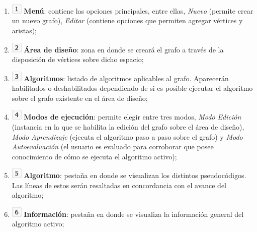 \documentclass{book}
\begin{document}
\begin{enumerate}
	\itemsep=8pt \topsep=0pt \partopsep=0pt \parskip=0pt \parsep=0pt
	
	\item [] \includegraphics[width=0.5cm]{images/number-1.png} \textbf{Menú}: contiene las opciones principales, entre ellas, \textit{Nuevo} (permite crear un nuevo grafo), \textit{Editar} (contiene opciones que permiten agregar vértices y aristas);

	\item [] \includegraphics[width=0.5cm]{images/number-2.png} \textbf{Área de diseño}: zona en donde se creará el grafo a través de la disposición de vértices sobre dicho espacio;

	\item [] \includegraphics[width=0.5cm]{images/number-3.png} \textbf{Algoritmos}: listado de algoritmos aplicables al grafo. Aparecerán habilitados o deshabilitados dependiendo de si es posible ejecutar el algoritmo sobre el grafo existente en el área de diseño;

	\item [] \includegraphics[width=0.5cm]{images/number-4.png} \textbf{Modos de ejecución}: permite elegir entre tres modos, \textit{Modo Edición} (instancia en la que se habilita la edición del grafo sobre el área de diseño), \textit{Modo Aprendizaje} (ejecuta el algoritmo paso a paso sobre el grafo) y \textit{Modo Autoevaluación} (el usuario es evaluado para corroborar que posee conocimiento de cómo se ejecuta el algoritmo activo);

	\item [] \includegraphics[width=0.5cm]{images/number-5.png} \textbf{Algoritmo}: pestaña en donde se visualizan los distintos pseudocódigos. Las líneas de estos serán resaltadas en concordancia con el avance del algoritmo;

	\item [] \includegraphics[width=0.5cm]{images/number-6.png} \textbf{Información}: pestaña en donde se visualiza la información general del algoritmo activo;


\end{enumerate}
\end{document}
